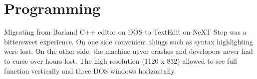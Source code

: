
\section{Programming}
Migrating from Borland C++ editor on DOS to TextEdit on NeXT Step was a bittersweet experience. On one side convenient things such as syntax highlighting were lost. On the other side, the machine never crashes and developers never had to curse over hours lost. The high resolution (1120 x 832) allowed to see full function vertically and three DOS windows horizontally. \\
\par
{}
\par
{}
